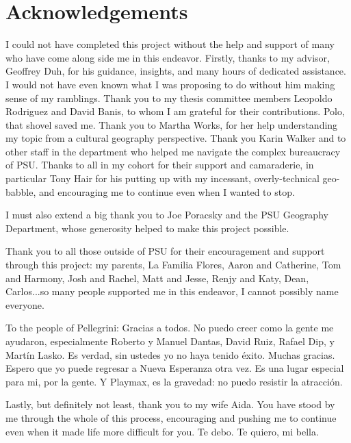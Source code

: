 \chapter*{Acknowledgements}

\pagestyle{headings}

I could not have completed this project without the help and support of many who have come along side me in this endeavor. Firstly, thanks to my advisor, Geoffrey Duh, for his guidance, insights, and many hours of dedicated assistance. I would not have even known what I was proposing to do without him making sense of my ramblings. Thank you to my thesis committee members Leopoldo Rodriguez and David Banis, to whom I am grateful for their contributions. Polo, that shovel saved me. Thank you to Martha Works, for her help understanding my topic from a cultural geography perspective. Thank you Karin Walker and to other staff in the department who helped me navigate the complex bureaucracy of PSU. Thanks to all in my cohort for their support and camaraderie, in particular Tony Hair for his putting up with my incessant, overly-technical geo-babble, and encouraging me to continue even when I wanted to stop.

I must also extend a big thank you to Joe Poracsky and the PSU Geography Department, whose generosity helped to make this project possible.

Thank you to all those outside of PSU for their encouragement and support through this project: my parents, La Familia Flores, Aaron and Catherine, Tom and Harmony, Josh and Rachel, Matt and Jesse, Renjy and Katy, Dean, Carlos...so many people supported me in this endeavor, I cannot possibly name everyone.


To the people of Pellegrini: Gracias a todos. No puedo creer como la gente me ayudaron, especialmente Roberto y Manuel Dantas, David Ruiz, Rafael Dip, y Martín Lasko. Es verdad, sin ustedes yo no haya tenido éxito. Muchas gracias. Espero que yo puede regresar a Nueva Esperanza otra vez. Es una lugar especial para mi, por la gente. Y Playmax, es la gravedad: no puedo resistir la atracción.


Lastly, but definitely not least, thank you to my wife Aida. You have stood by me through the whole of this process, encouraging and pushing me to continue even when it made life more difficult for you. Te debo. Te quiero, mi bella.
